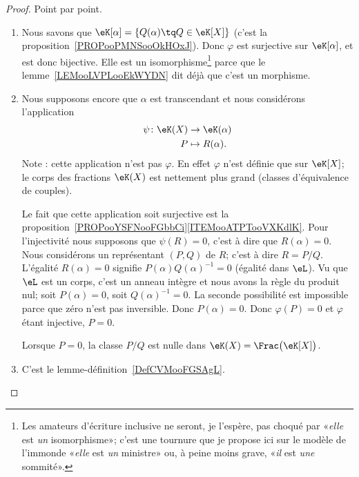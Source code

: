 \begin{proof}
    Point par point.
    \begin{enumerate}
        \item
            Nous savons que \( \eK[\alpha]=\{ Q(\alpha)\tq Q\in \eK[X] \}\) (c'est la proposition~\ref{PROPooPMNSooOkHOxJ}). Donc \( \varphi\) est surjective sur \( \eK[\alpha]\), et est donc bijective. Elle est un isomorphisme\footnote{Les amateurs d'écriture inclusive ne seront, je l'espère, pas choqué par «\emph{elle} est \emph{un} isomorphisme»; c'est une tournure que je propose ici sur le modèle de l'immonde «\emph{elle} est \emph{un} ministre» ou, à peine moins grave, «\emph{il} est \emph{une} sommité».} parce que le lemme~\ref{LEMooLVPLooEkWYDN} dit déjà que c'est un morphisme.
        \item
            Nous supposons encore que \( \alpha\) est transcendant et nous considérons l'application
            \begin{equation}
                \begin{aligned}
                    \psi\colon \eK(X)&\to \eK(\alpha) \\
                    P&\mapsto R(\alpha).
                \end{aligned}
            \end{equation}
            Note : cette application n'est pas \( \varphi\). En effet \( \varphi\) n'est définie que sur \( \eK[X]\); le corps des fractions \( \eK(X)\) est nettement plus grand (classes d'équivalence de couples).

            Le fait que cette application soit surjective est la proposition~\ref{PROPooYSFNooFGbbCi}\ref{ITEMooATPTooVXKdlK}. Pour l'injectivité nous supposons que \( \psi(R)=0\), c'est à dire que \( R(\alpha)=0\). Nous considérons un représentant \( (P,Q)\) de \( R\); c'est à dire \( R=P/Q\). L'égalité \( R(\alpha)=0\) signifie \( P(\alpha)Q(\alpha)^{-1}=0\) (égalité dans \( \eL\)). Vu que \( \eL\) est un corps, c'est un anneau intègre et nous avons la règle du produit nul; soit \( P(\alpha)=0\), soit \( Q(\alpha)^{-1}=0\). La seconde possibilité est impossible parce que zéro n'est pas inversible. Donc \( P(\alpha)=0\). Donc \( \varphi(P)=0\) et \( \varphi\) étant injective, \( P=0\).

            Lorsque \( P=0\), la classe \( P/Q\) est nulle dans \( \eK(X)= \Frac\big(\eK[X]\big)\).

        \item

            C'est le lemme-définition~\ref{DefCVMooFGSAgL}.
    \end{enumerate}
\end{proof}

